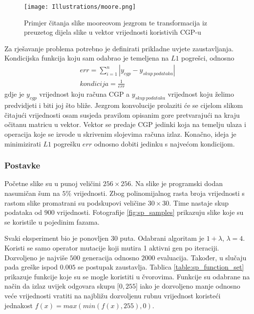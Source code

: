 \begin{figure}
	\centering
	\texttt{[image: Illustrations/moore.png]}
	\caption{Primjer čitanja slike mooreovom jezgrom te transformacija iz preuzetog dijela slike u vektor vrijednosti koristivih CGP-u}
	\label{fig:moore_example}
\end{figure}

Za rješavanje problema potrebno je definirati prikladne uvjete zaustavljanja.
Kondicijska funkcija koju sam odabrao je temeljena na $L1$ pogrešci, odnosno
\begin{gather*}
err = \sum_{i=1}^{n} |y_{cgp} - y_{skup\ podataka}| \\
kondicija = \frac{1}{err}
\end{gather*}
gdje je $y_{cgp}$ vrijednost koju računa CGP a $y_{skup\ podataka}$ vrijednost koju želimo predvidjeti i biti joj što bliže.
Jezgrom konvolucije prolaziti će se cijelom slikom čitajući vrijednosti osam susjeda pravilom opisanim gore pretvarajući na kraju očitanu matricu u vektor.
Vektor se predaje CGP jedinki koja na temelju ulaza i operacija koje se izvode u skrivenim slojevima računa izlaz.
Konačno, ideja je minimizirati $L1$ pogrešku $err$ odnosno dobiti jedinku s najvećom kondicijom.

\subsubsection{Postavke}
Početne slike su u punoj veličini $256 \times 256$.
Na slike je programski dodan nasumičan šum na $5\%$ vrijednosti.
Zbog polinomijalnog rasta broja vrijednosti s rastom slike promatrani su podskupovi veličine $30 \times 30$.
Time nastaje skup podataka od $900$ vrijednosti.
Fotografije \ref{fig:sp_samples} prikazuju slike koje su se koristile u pojedinim fazama.

Svaki eksperiment bio je ponovljen 30 puta.
Odabrani algoritam je $1 + \lambda$, $\lambda = 4$.
Koristi se samo operator mutacije koji mutira 1 aktivni gen po iteraciji.
Dozvoljeno je najviše $500$ generacija odnosno $2000$ evaluacija.
Također, u slučaju pada greške ispod $0.005$ se postupak zaustavlja.
Tablica \ref{table:sp_function_set} prikazuje funkcije koje su se mogle koristiti u čvorovima.
Funkcije su odabrane na način da izlaz uvijek odgovara skupu $[0, 255$] iako je dozvoljeno manje odnosno veće vrijednosti vratiti na najbližu dozvoljenu rubnu vrijednost koristeći jednakost $f(x) = max(min(f(x), 255), 0)$.

